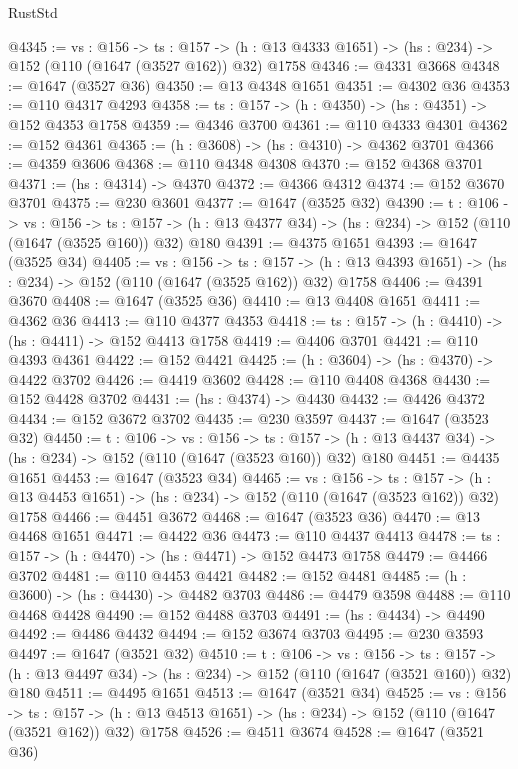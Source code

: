 \begin{lexlean}{RustStd}
\begin{coremodule}
@4345 := {vs : @156} ->
  {ts : @157} -> (h : @13 @4333 @1651) -> (hs : @234) -> @152 (@110 (@1647 (@3527 @162)) @32) @1758
@4346 := @4331 @3668
@4348 := @1647 (@3527 @36)
@4350 := @13 @4348 @1651
@4351 := @4302 @36
@4353 := @110 @4317 @4293
@4358 := {ts : @157} -> (h : @4350) -> (hs : @4351) -> @152 @4353 @1758
@4359 := @4346 @3700
@4361 := @110 @4333 @4301
@4362 := @152 @4361
@4365 := (h : @3608) -> (hs : @4310) -> @4362 @3701
@4366 := @4359 @3606
@4368 := @110 @4348 @4308
@4370 := @152 @4368 @3701
@4371 := (hs : @4314) -> @4370
@4372 := @4366 @4312
@4374 := @152 @3670 @3701
@4375 := @230 @3601
@4377 := @1647 (@3525 @32)
@4390 := {t : @106} ->
  {vs : @156} ->
  {ts : @157} -> (h : @13 @4377 @34) -> (hs : @234) -> @152 (@110 (@1647 (@3525 @160)) @32) @180
@4391 := @4375 @1651
@4393 := @1647 (@3525 @34)
@4405 := {vs : @156} ->
  {ts : @157} -> (h : @13 @4393 @1651) -> (hs : @234) -> @152 (@110 (@1647 (@3525 @162)) @32) @1758
@4406 := @4391 @3670
@4408 := @1647 (@3525 @36)
@4410 := @13 @4408 @1651
@4411 := @4362 @36
@4413 := @110 @4377 @4353
@4418 := {ts : @157} -> (h : @4410) -> (hs : @4411) -> @152 @4413 @1758
@4419 := @4406 @3701
@4421 := @110 @4393 @4361
@4422 := @152 @4421
@4425 := (h : @3604) -> (hs : @4370) -> @4422 @3702
@4426 := @4419 @3602
@4428 := @110 @4408 @4368
@4430 := @152 @4428 @3702
@4431 := (hs : @4374) -> @4430
@4432 := @4426 @4372
@4434 := @152 @3672 @3702
@4435 := @230 @3597
@4437 := @1647 (@3523 @32)
@4450 := {t : @106} ->
  {vs : @156} ->
  {ts : @157} -> (h : @13 @4437 @34) -> (hs : @234) -> @152 (@110 (@1647 (@3523 @160)) @32) @180
@4451 := @4435 @1651
@4453 := @1647 (@3523 @34)
@4465 := {vs : @156} ->
  {ts : @157} -> (h : @13 @4453 @1651) -> (hs : @234) -> @152 (@110 (@1647 (@3523 @162)) @32) @1758
@4466 := @4451 @3672
@4468 := @1647 (@3523 @36)
@4470 := @13 @4468 @1651
@4471 := @4422 @36
@4473 := @110 @4437 @4413
@4478 := {ts : @157} -> (h : @4470) -> (hs : @4471) -> @152 @4473 @1758
@4479 := @4466 @3702
@4481 := @110 @4453 @4421
@4482 := @152 @4481
@4485 := (h : @3600) -> (hs : @4430) -> @4482 @3703
@4486 := @4479 @3598
@4488 := @110 @4468 @4428
@4490 := @152 @4488 @3703
@4491 := (hs : @4434) -> @4490
@4492 := @4486 @4432
@4494 := @152 @3674 @3703
@4495 := @230 @3593
@4497 := @1647 (@3521 @32)
@4510 := {t : @106} ->
  {vs : @156} ->
  {ts : @157} -> (h : @13 @4497 @34) -> (hs : @234) -> @152 (@110 (@1647 (@3521 @160)) @32) @180
@4511 := @4495 @1651
@4513 := @1647 (@3521 @34)
@4525 := {vs : @156} ->
  {ts : @157} -> (h : @13 @4513 @1651) -> (hs : @234) -> @152 (@110 (@1647 (@3521 @162)) @32) @1758
@4526 := @4511 @3674
@4528 := @1647 (@3521 @36)

\end{coremodule}
\end{lexlean}
